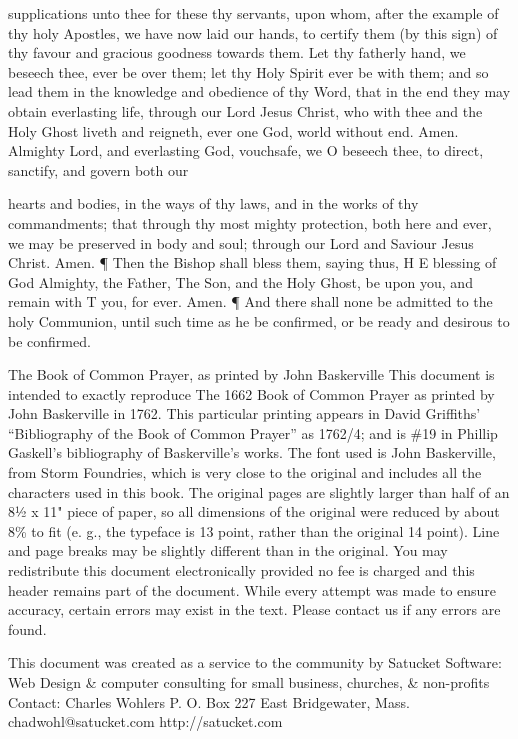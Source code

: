 supplications unto thee for these thy servants, upon whom, after the example of thy holy Apostles, we have now laid our hands, to certify them (by this sign) of thy favour and gracious goodness towards them. Let thy fatherly hand, we beseech thee, ever be over them; let thy Holy Spirit ever be with them; and so lead them in the knowledge and obedience of thy Word, that in the end they may obtain everlasting life, through our Lord Jesus Christ, who with thee and the Holy Ghost liveth and reigneth, ever one God, world without end. Amen. Almighty Lord, and everlasting God, vouchsafe, we O beseech thee, to direct, sanctify, and govern both our

hearts and bodies, in the ways of thy laws, and in the works of thy commandments; that through thy most mighty protection, both here and ever, we may be preserved in body and soul; through our Lord and Saviour Jesus Christ. Amen. ¶ Then the Bishop shall bless them, saying thus, H E blessing of God Almighty, the Father, The Son, and the Holy Ghost, be upon you, and remain with T you, for ever. Amen. ¶ And there shall none be admitted to the holy Communion, until such time as he be confirmed, or be ready and desirous to be confirmed.


The Book of Common Prayer, as printed by John Baskerville This document is intended to exactly reproduce The 1662 Book of Common Prayer as printed by John Baskerville in 1762. This particular printing appears in David Griffiths' “Bibliography of the Book of Common Prayer” as 1762/4; and is \#19 in Phillip Gaskell's bibliography of Baskerville's works. The font used is John Baskerville, from Storm Foundries, which is very close to the original and includes all the characters used in this book. The original pages are slightly larger than half of an 8½ x 11" piece of paper, so all dimensions of the original were reduced by about 8\% to fit (e. g., the typeface is 13 point, rather than the original 14 point). Line and page breaks may be slightly different than in the original. You may redistribute this document electronically provided no fee is charged and this header remains part of the document. While every attempt was made to ensure accuracy, certain errors may exist in the text. Please contact us if any errors are found.

This document was created as a service to the community by Satucket Software: Web Design \& computer consulting for small business, churches, \& non-profits Contact: Charles Wohlers P. O. Box 227 East Bridgewater, Mass. chadwohl@satucket.com http://satucket.com

